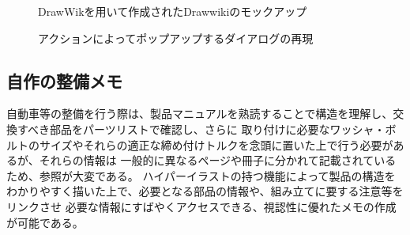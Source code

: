 \begin{figure}[H] \begin{minipage}{0.5\hsize}
                      \begin{center} 
                      \end{center} \caption{DrawWikを用いて作成されたDrawwikiのモックアップ} \label{fig:protodrawwiki1}
\end{minipage} \begin{minipage}{0.5\hsize}
                   \begin{center} 
                   \end{center} \caption{アクションによってポップアップするダイアログの再現} \label{fig:protodrawwiki2}
\end{minipage}
\end{figure}


\subsection{自作の整備メモ}
自動車等の整備を行う際は、製品マニュアルを熟読することで構造を理解し、交換すべき部品をパーツリストで確認し、さらに
取り付けに必要なワッシャ・ボルトのサイズやそれらの適正な締め付けトルクを念頭に置いた上で行う必要があるが、それらの情報は
一般的に異なるページや冊子に分かれて記載されているため、参照が大変である。
ハイパーイラストの持つ機能によって製品の構造をわかりやすく描いた上で、必要となる部品の情報や、組み立てに要する注意等をリンクさせ
必要な情報にすばやくアクセスできる、視認性に優れたメモの作成が可能である。

